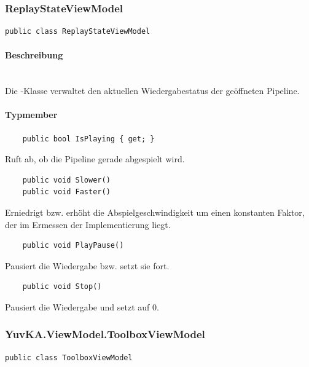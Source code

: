 \subsubsection{ReplayStateViewModel}

\begin{verbatim}
public class ReplayStateViewModel
\end{verbatim}

\paragraph{Beschreibung}~\\
Die -Klasse verwaltet den aktuellen Wiedergabestatus der geöffneten Pipeline.

\paragraph{Typmember}
\begin{itemize}

	\begin{verbatim}
	public bool IsPlaying { get; }
	\end{verbatim}
	Ruft ab, ob die Pipeline gerade abgespielt wird.

	\begin{verbatim}
	public void Slower()
	public void Faster()
	\end{verbatim}
	Erniedrigt bzw. erhöht die Abspielgeschwindigkeit um einen konstanten Faktor, der im Ermessen der Implementierung liegt.

	\begin{verbatim}
	public void PlayPause()
	\end{verbatim}
	Pausiert die Wiedergabe bzw. setzt sie fort.

	\begin{verbatim}
	public void Stop()
	\end{verbatim}
	Pausiert die Wiedergabe und setzt  auf 0.

\end{itemize}

\subsubsection{YuvKA.ViewModel.ToolboxViewModel}

\begin{verbatim}
public class ToolboxViewModel
\end{verbatim}

